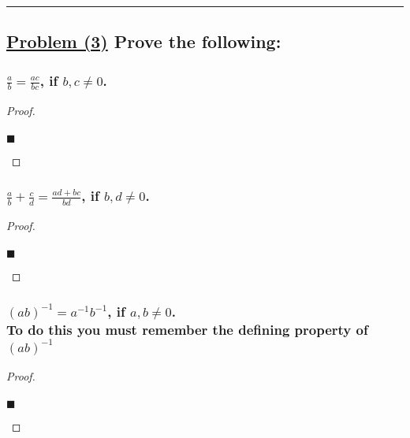 \documentclass[letterpaper, 10 pt, conference]{ieeeconf}  %
\begin{document}
\noindent\rule{8cm}{0.4pt}

\subsection{\textbf{\underline{Problem (3)} Prove the following: }}

\subsubsection{\textbf{$\frac{a}{b} = \frac{ac}{bc}$, if $b, c \neq 0$.}}
\begin{proof}
\begin{align}
    
\end{align}
\begin{flushright}
$\blacksquare$
\end{flushright}
\end{proof}

\subsubsection{\textbf{$\frac{a}{b} + \frac{c}{d} = \frac{ad + bc}{bd}$, if $b, d \neq 0$.}}
\begin{proof}
\begin{align}
    
\end{align}
\begin{flushright}
$\blacksquare$
\end{flushright}
\end{proof}

\subsubsection{\textbf{$(ab)^{-1} = a^{-1}b^{-1}$, if $a, b \neq 0$. \\ \small{To do this you must remember the defining property of $(ab)^{-1}$}}}
\begin{proof}
\begin{align}
    
\end{align}
\begin{flushright}
$\blacksquare$
\end{flushright}
\end{proof}
\end{document}
